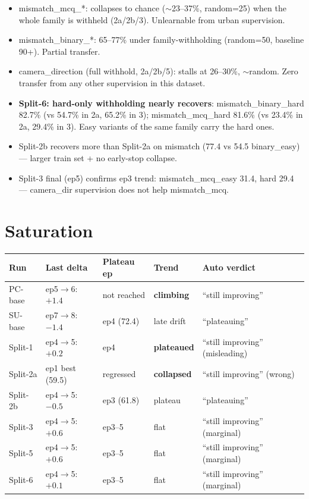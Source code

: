 \documentclass[11pt]{article}
\newcommand{\good}[1]{\textcolor{good}{\textbf{#1}}}
\newcommand{\bad}[1]{\textcolor{bad}{\textbf{#1}}}
\begin{document}
\begin{itemize}\itemsep1pt
\item mismatch\_mcq\_*: collapses to chance ($\sim$23--37\%, random=25) when the whole family is withheld (2a/2b/3). Unlearnable from urban supervision.
\item mismatch\_binary\_*: 65--77\% under family-withholding (random=50, baseline 90+). Partial transfer.
\item camera\_direction (full withhold, 2a/2b/5): stalls at 26--30\%, $\sim$random. Zero transfer from any other supervision in this dataset.
\item \textbf{Split-6: hard-only withholding nearly recovers}: mismatch\_binary\_hard 82.7\% (vs 54.7\% in 2a, 65.2\% in 3); mismatch\_mcq\_hard 81.6\% (vs 23.4\% in 2a, 29.4\% in 3). Easy variants of the same family carry the hard ones.
\item Split-2b recovers more than Split-2a on mismatch (77.4 vs 54.5 binary\_easy) --- larger train set + no early-stop collapse.
\item Split-3 final (ep5) confirms ep3 trend: mismatch\_mcq\_easy 31.4, hard 29.4 --- camera\_dir supervision does not help mismatch\_mcq.
\end{itemize}

\newpage
\section{Saturation}

\begin{table}[h]\centering\small
\setlength{\tabcolsep}{6pt}
\renewcommand{\arraystretch}{1.15}
\begin{tabular}{l l l l l}
\toprule
\textbf{Run} & \textbf{Last delta} & \textbf{Plateau ep} & \textbf{Trend} & \textbf{Auto verdict} \\
\midrule
PC-base    & ep5$\to$6: $+1.4$    & not reached       & \good{climbing}    & ``still improving'' \\
SU-base    & ep7$\to$8: $-1.4$    & ep4 (72.4)        & late drift         & ``plateauing'' \\
Split-1    & ep4$\to$5: $+0.2$    & ep4               & \good{plateaued}   & ``still improving'' (misleading) \\
Split-2a   & ep1 best (59.5)      & regressed         & \bad{collapsed}    & ``still improving'' (wrong) \\
Split-2b   & ep4$\to$5: $-0.5$    & ep3 (61.8)        & plateau            & ``plateauing'' \\
Split-3    & ep4$\to$5: $+0.6$    & ep3--5            & flat               & ``still improving'' (marginal) \\
Split-5    & ep4$\to$5: $+0.6$    & ep3--5            & flat               & ``still improving'' (marginal) \\
Split-6    & ep4$\to$5: $+0.1$    & ep3--5            & flat               & ``still improving'' (marginal) \\
\bottomrule
\end{tabular}
\end{table}
\end{document}
